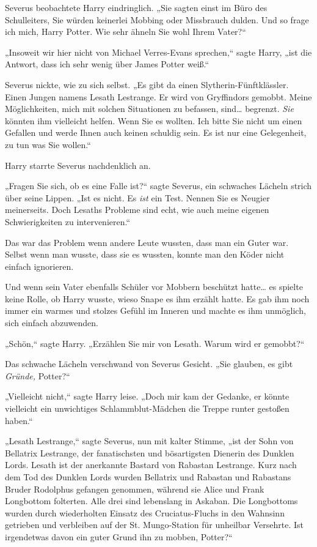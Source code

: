 {Severus beobachtete Harry eindringlich. „Sie sagten einst im Büro des Schulleiters, Sie würden keinerlei Mobbing oder Missbrauch dulden. Und so frage ich mich, Harry Potter. Wie sehr ähneln Sie wohl Ihrem Vater?“

„Insoweit wir hier nicht von Michael Verres-Evans sprechen,“ sagte Harry, „ist die Antwort, dass ich sehr wenig über James Potter weiß.“

Severus nickte, wie zu sich selbst. „Es gibt da einen Slytherin-Fünftklässler. Einen Jungen namens Lesath Lestrange. Er wird von Gryffindors gemobbt. Meine Möglichkeiten, mich mit solchen Situationen zu befassen, sind… begrenzt. \emph{Sie} könnten ihm vielleicht helfen. Wenn Sie es wollten. Ich bitte Sie nicht um einen Gefallen und werde Ihnen auch keinen schuldig sein. Es ist nur eine Gelegenheit, zu tun was Sie wollen.“

Harry starrte Severus nachdenklich an.

„Fragen Sie sich, ob es eine Falle ist?“ sagte Severus, ein schwaches Lächeln strich über seine Lippen. „Ist es nicht. Es \emph{ist} ein Test. Nennen Sie es Neugier meinerseits. Doch Lesaths Probleme sind echt, wie auch meine eigenen Schwierigkeiten zu intervenieren.“

Das war das Problem wenn andere Leute wussten, dass man ein Guter war. Selbst wenn man wusste, dass sie es wussten, konnte man den Köder nicht einfach ignorieren.

Und wenn sein Vater ebenfalls Schüler vor Mobbern beschützt hatte… es spielte keine Rolle, ob Harry wusste, wieso Snape es ihm erzählt hatte. Es gab ihm noch immer ein warmes und stolzes Gefühl im Inneren und machte es ihm unmöglich, sich einfach abzuwenden.

„Schön,“ sagte Harry. „Erzählen Sie mir von Lesath. Warum wird er gemobbt?“

Das schwache Lächeln verschwand von Severus Gesicht. „Sie glauben, es gibt \emph{Gründe,} Potter?“

„Vielleicht nicht,“ sagte Harry leise. „Doch mir kam der Gedanke, er könnte vielleicht ein unwichtiges Schlammblut-Mädchen die Treppe runter gestoßen haben.“

„Lesath Lestrange,“ sagte Severus, nun mit kalter Stimme, „ist der Sohn von Bellatrix Lestrange, der fanatischsten und bösartigsten Dienerin des Dunklen Lords. Lesath ist der anerkannte Bastard von Rabastan Lestrange. Kurz nach dem Tod des Dunklen Lords wurden Bellatrix und Rabastan und Rabastans Bruder Rodolphus gefangen genommen, während sie Alice und Frank Longbottom folterten. Alle drei sind lebenslang in Askaban. Die Longbottoms wurden durch wiederholten Einsatz des Cruciatus-Fluchs in den Wahnsinn getrieben und verbleiben auf der St. Mungo-Station für unheilbar Versehrte. Ist irgendetwas davon ein guter Grund ihn zu mobben, Potter?“

}
